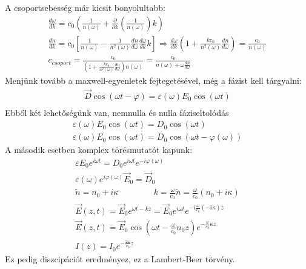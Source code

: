 \documentclass{article}
\begin{document}
A csoportsebesség már kicsit bonyolultabb:
\begin{gather*}
\frac{d\omega}{dk} = c_0\left( \frac{1}{n(\omega)} + \frac{\partial}{\partial k} \left( \frac{1}{n(\omega)}\right)k \right) \\
\frac{dn}{dk}=c_0 \left[ \frac{1}{n(\omega)} - \frac{1}{n^2(\omega)} \frac{dn}{d\omega} \frac{d\omega}{dk}k \right] \Rightarrow  \frac{d\omega}{dk} \left(  1+ \frac{kc_0}{n^2(\omega)} \frac{dn}{d\omega} \right) = \frac{c_0}{n(\omega)} \\
c_{csoport} = \frac{c_0}{( 1+ \frac{kc_0}{n^2(\omega)} \frac{dn}{d\omega} )n(\omega)} = \frac{c_0}{n(\omega) + \omega \frac{dn}{d\omega}}
\end{gather*}
Menjünk tovább a maxwell-egyenletek fejtegetésével, még a fázist kell tárgyalni:
\begin{gather*}
\vec{D} \cos(\omega t - \varphi) = \varepsilon(\omega) E_0 \cos(\omega t) \\
\end{gather*}
Ebből két lehetőségünk van, nemnulla és nulla fáziseltolódás
\begin{gather*}
\varepsilon(\omega) E_0 \cos(\omega t) = D_0 \cos(\omega t) \\
\varepsilon(\omega) E_0 \cos(\omega t) = D_0 \cos(\omega t - \varphi(\omega)) 
\end{gather*}
A második esetben komplex törésmutatót kapunk:
\begin{gather*}
\varepsilon E_0 e^{i\omega t} = D_0 e^{i\omega t} e^{-i\varphi(\omega)} \\
\varepsilon(\omega) e^{i\varphi(\omega)} \vec{E}_0 = \vec{D}_0 \\
\tilde{n} = n_0 + i\kappa \hspace{50pt} k = \frac{\omega}{c_0} \tilde{n} = \frac{\omega}{c_0} (n_0 + i\kappa) \\
\vec{E}(z,t) = \vec{E}_0 e^{\omega t - kz} = \vec{E}_0 e^{i\omega t} e^{-i\frac{\omega}{c_0} (-i\kappa) z} \\
\vec{E}(z,t) = \vec{E}_0 \cos(\omega t - \frac{\omega}{c_0}n_0 z) e^{-\frac{\omega}{c_0}\kappa z} \\
I(z) = I_0 e^{-\frac{2\omega}{c_0} z}
\end{gather*}
Ez pedig diszcipációt eredményez, ez a Lambert-Beer törvény.
\end{document}
